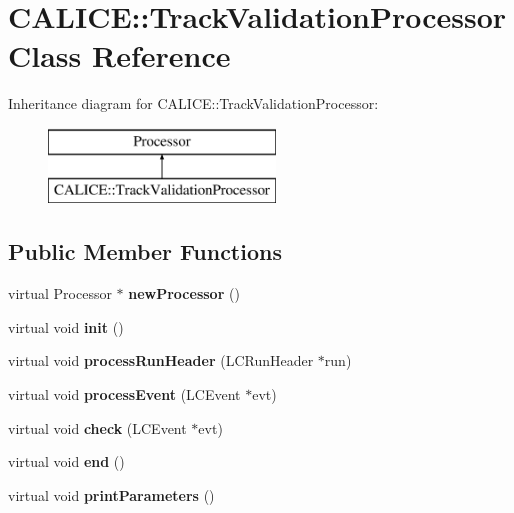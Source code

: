 \section{C\-A\-L\-I\-C\-E\-:\-:Track\-Validation\-Processor Class Reference}
\label{classCALICE_1_1TrackValidationProcessor}
Inheritance diagram for C\-A\-L\-I\-C\-E\-:\-:Track\-Validation\-Processor\-:\begin{figure}[H]
\begin{center}
\leavevmode
\includegraphics[height=2.000000cm]{classCALICE_1_1TrackValidationProcessor}
\end{center}
\end{figure}
\subsection*{Public Member Functions}
\begin{DoxyCompactItemize}
\item 
virtual Processor $\ast$ {\bfseries new\-Processor} ()\label{classCALICE_1_1TrackValidationProcessor_aab6ced0d983b435a5b9524b6af9b8fab}

\item 
virtual void {\bfseries init} ()\label{classCALICE_1_1TrackValidationProcessor_ab80de3e3a345b87b67499420a6a6e2da}

\item 
virtual void {\bfseries process\-Run\-Header} (L\-C\-Run\-Header $\ast$run)\label{classCALICE_1_1TrackValidationProcessor_a41ff5e507417459b4eacccd9073bce3e}

\item 
virtual void {\bfseries process\-Event} (L\-C\-Event $\ast$evt)\label{classCALICE_1_1TrackValidationProcessor_a3f5d0bcd0d0fb86398db8e25dcaf3884}

\item 
virtual void {\bfseries check} (L\-C\-Event $\ast$evt)\label{classCALICE_1_1TrackValidationProcessor_a45f45ade83bd6f8111fe9794251c963f}

\item 
virtual void {\bfseries end} ()\label{classCALICE_1_1TrackValidationProcessor_a2478d1c6021e9f78a5a7489ecafe61cc}

\item 
virtual void {\bfseries print\-Parameters} ()\label{classCALICE_1_1TrackValidationProcessor_a86b4f58b01d3a5b21cb409b6608cafc7}

\end{DoxyCompactItemize}
